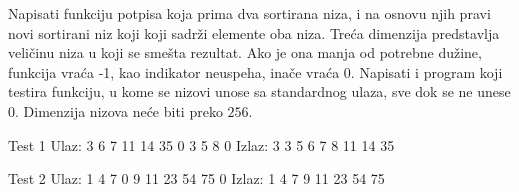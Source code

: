 \begin{Answer}[ref=504]
\end{Answer}
\begin{Exercise}[label=505]
  Napisati funkciju potpisa  koja prima dva sortirana
  niza, i na osnovu njih pravi novi sortirani niz koji koji sadrži
  elemente oba niza. Treća dimenzija predstavlja veličinu niza u koji
  se smešta rezultat. Ako je ona manja od potrebne dužine, funkcija
  vraća -1, kao indikator neuspeha, inače vraća 0. Napisati i program
  koji testira funkciju, u kome se nizovi unose sa standardnog ulaza,
  sve dok se ne unese 0. Dimenzija nizova neće biti preko $256$.
  
\begin{miditest}
\begin{test}{Test 1}
Ulaz:   3 6 7 11 14 35 0 3 5 8 0
Izlaz:  3 3 5 6 7 8 11 14 35
\end{test}
\end{miditest}

\begin{miditest}
\begin{test}{Test 2}
Ulaz:   1 4 7 0 9 11 23 54 75 0
Izlaz:  1 4 7 9 11 23 54 75
\end{test}
\end{miditest}
  
\end{Exercise}

